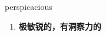 
\begin{frame}
{\huge perspicacious}
\begin{center}
\begin{enumerate}\Large
  \item \textbf{极敏锐的，有洞察力的}
\end{enumerate}
\end{center}
\end{frame}

